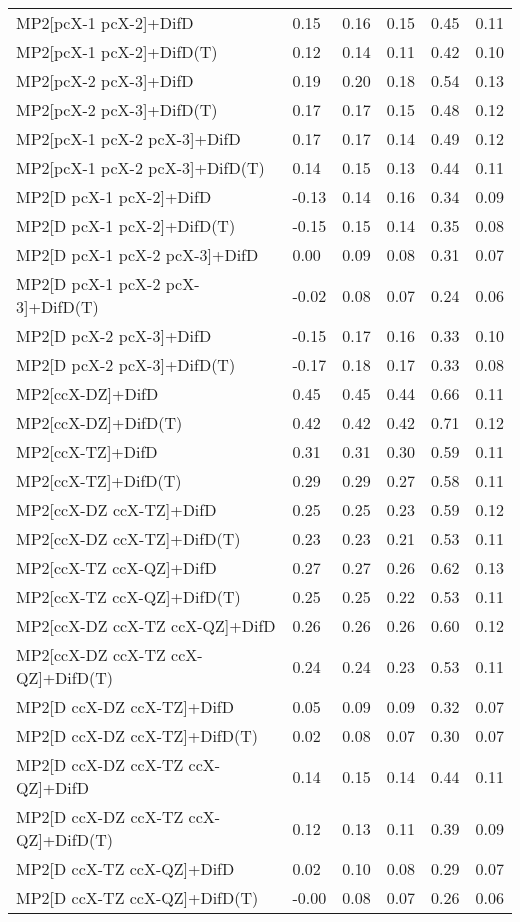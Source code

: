 \begin{table}
\begin{tabular}{l l l l l l }
    MP2[pcX-1 pcX-2]+DifD & 0.15 & 0.16 & 0.15 & 0.45 & 0.11 \\ 
    MP2[pcX-1 pcX-2]+DifD(T) & 0.12 & 0.14 & 0.11 & 0.42 & 0.10 \\ 
    MP2[pcX-2 pcX-3]+DifD & 0.19 & 0.20 & 0.18 & 0.54 & 0.13 \\ 
    MP2[pcX-2 pcX-3]+DifD(T) & 0.17 & 0.17 & 0.15 & 0.48 & 0.12 \\ 
    MP2[pcX-1 pcX-2 pcX-3]+DifD & 0.17 & 0.17 & 0.14 & 0.49 & 0.12 \\ 
    MP2[pcX-1 pcX-2 pcX-3]+DifD(T) & 0.14 & 0.15 & 0.13 & 0.44 & 0.11 \\ 
    MP2[D pcX-1 pcX-2]+DifD & -0.13 & 0.14 & 0.16 & 0.34 & 0.09 \\ 
    MP2[D pcX-1 pcX-2]+DifD(T) & -0.15 & 0.15 & 0.14 & 0.35 & 0.08 \\ 
    MP2[D pcX-1 pcX-2 pcX-3]+DifD & 0.00 & 0.09 & 0.08 & 0.31 & 0.07 \\ 
    MP2[D pcX-1 pcX-2 pcX-3]+DifD(T) & -0.02 & 0.08 & 0.07 & 0.24 & 0.06 \\ 
    MP2[D pcX-2 pcX-3]+DifD & -0.15 & 0.17 & 0.16 & 0.33 & 0.10 \\ 
    MP2[D pcX-2 pcX-3]+DifD(T) & -0.17 & 0.18 & 0.17 & 0.33 & 0.08 \\ 
    MP2[ccX-DZ]+DifD & 0.45 & 0.45 & 0.44 & 0.66 & 0.11 \\ 
    MP2[ccX-DZ]+DifD(T) & 0.42 & 0.42 & 0.42 & 0.71 & 0.12 \\ 
    MP2[ccX-TZ]+DifD & 0.31 & 0.31 & 0.30 & 0.59 & 0.11 \\ 
    MP2[ccX-TZ]+DifD(T) & 0.29 & 0.29 & 0.27 & 0.58 & 0.11 \\ 
    MP2[ccX-DZ ccX-TZ]+DifD & 0.25 & 0.25 & 0.23 & 0.59 & 0.12 \\ 
    MP2[ccX-DZ ccX-TZ]+DifD(T) & 0.23 & 0.23 & 0.21 & 0.53 & 0.11 \\ 
    MP2[ccX-TZ ccX-QZ]+DifD & 0.27 & 0.27 & 0.26 & 0.62 & 0.13 \\ 
    MP2[ccX-TZ ccX-QZ]+DifD(T) & 0.25 & 0.25 & 0.22 & 0.53 & 0.11 \\ 
    MP2[ccX-DZ ccX-TZ ccX-QZ]+DifD & 0.26 & 0.26 & 0.26 & 0.60 & 0.12 \\ 
    MP2[ccX-DZ ccX-TZ ccX-QZ]+DifD(T) & 0.24 & 0.24 & 0.23 & 0.53 & 0.11 \\ 
    MP2[D ccX-DZ ccX-TZ]+DifD & 0.05 & 0.09 & 0.09 & 0.32 & 0.07 \\ 
    MP2[D ccX-DZ ccX-TZ]+DifD(T) & 0.02 & 0.08 & 0.07 & 0.30 & 0.07 \\ 
    MP2[D ccX-DZ ccX-TZ ccX-QZ]+DifD & 0.14 & 0.15 & 0.14 & 0.44 & 0.11 \\ 
    MP2[D ccX-DZ ccX-TZ ccX-QZ]+DifD(T) & 0.12 & 0.13 & 0.11 & 0.39 & 0.09 \\ 
    MP2[D ccX-TZ ccX-QZ]+DifD & 0.02 & 0.10 & 0.08 & 0.29 & 0.07 \\ 
    MP2[D ccX-TZ ccX-QZ]+DifD(T) & -0.00 & 0.08 & 0.07 & 0.26 & 0.06 \\ 
    \bottomrule
  \end{tabular}
\end{table}
